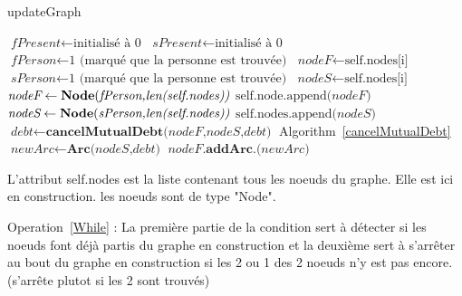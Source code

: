 \documentclass[a4paper]{article}
\begin{document}
\begin{algorithm}[H]
\caption{updateGraph}\label{updateGraph()}
\begin{algorithmic}[1]
\State $\textit{fPresent} \gets \text{initialisé à 0} $ 
\State $\textit{sPresent} \gets \text{initialisé à 0} $
 \label{While}
\State $\textit{fPerson} \gets \text{1 (marqué que la personne est trouvée)}$
\State $\textit{nodeF} \gets \text{self.nodes[i]}$
\EndIf
{}
\State $\textit{sPerson} \gets \text{1 (marqué que la personne est trouvée)}$
\State $\textit{nodeS} \gets \text{self.nodes[i]}$
\EndIf
\EndWhile
{} 
\State $\textit{nodeF} \gets \textbf{Node}\text{(}\textit{fPerson,len(self.nodes)\text{)}} $
\State $\text{self.node.append(}\textit{nodeF}\text{)}$
\EndIf
{} 
\State $\textit{nodeS} \gets \textbf{Node}\text{(}\textit{sPerson,len(self.nodes)\text{)}} $
\State $\text{self.nodes.append(}\textit{nodeS}\text{)}$
\EndIf
{} 
\State $\textit{debt} \gets \textbf{cancelMutualDebt}\text{(}\textit{nodeF,nodeS,debt}\text{)} $  Algorithm~\ref{cancelMutualDebt}
\EndIf
\State $\textit{newArc} \gets \textbf{Arc}\textit{(nodeS,debt)}$
\State $\textit{nodeF.}\textbf{addArc.}\textit{(newArc)} $    	
\EndProcedure
\end{algorithmic}
\end{algorithm}

L'attribut self.nodes est la liste contenant tous les noeuds du graphe. Elle est ici en construction. les noeuds sont de type "Node".

Operation~\ref{While} : La première partie de la condition sert à détecter si les noeuds font déjà partis du graphe en construction et la deuxième sert à s'arrêter au bout du graphe en construction si les 2 ou 1 des 2 noeuds n'y est pas encore.(s'arrête plutot si les 2 sont trouvés)
\end{document}
